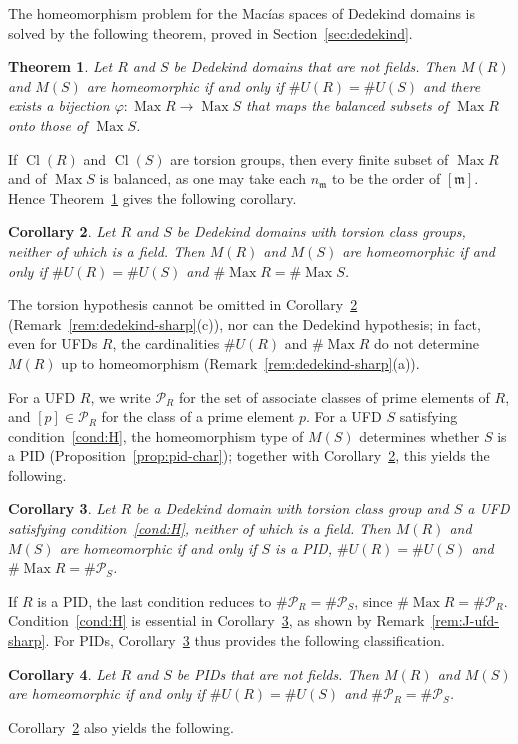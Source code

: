 \documentclass[12pt,reqno,a4paper]{amsart}
\newcommand{\Pe}{\mathcal{P}}
\newcommand{\m}{\mathfrak{m}}
\DeclareMathOperator{\Max}{Max}
\DeclareMathOperator{\Cl}{Cl}
\theoremstyle{plain}
\newtheorem{theorem}{Theorem}[section]
\newtheorem{corollary}[theorem]{Corollary}
\theoremstyle{definition}
\begin{document}
The homeomorphism problem for the Mac\'ias spaces of Dedekind domains is solved by the following theorem, proved in Section~\ref{sec:dedekind}.
\begin{theorem}\label{thm:C}
Let $R$ and $S$ be Dedekind domains that are not fields. Then $M(R)$ and $M(S)$ are homeomorphic if and only if $\#U(R)=\#U(S)$ and there exists a bijection $\varphi\colon\Max R\to\Max S$ that maps the balanced subsets of $\Max R$ onto those of $\Max S$.
\end{theorem}

If $\Cl(R)$ and $\Cl(S)$ are torsion groups, then every finite subset of $\Max R$ and of $\Max S$ is balanced, as one may take each $n_\m$ to be the order of $[\m]$. Hence Theorem~\ref{thm:C} gives the following corollary.
\begin{corollary}\label{cor:torsion}
Let $R$ and $S$ be Dedekind domains with torsion class groups, neither of which is a field. Then $M(R)$ and $M(S)$ are homeomorphic if and only if $\#U(R)=\#U(S)$ and $\#{\Max R}=\#{\Max S}$.
\end{corollary}

The torsion hypothesis cannot be omitted in Corollary~\ref{cor:torsion} (Remark~\ref{rem:dedekind-sharp}(c)), nor can the Dedekind hypothesis; in fact, even for UFDs $R$, the cardinalities $\#U(R)$ and $\#{\Max R}$ do not determine $M(R)$ up to homeomorphism (Remark~\ref{rem:dedekind-sharp}(a)).

For a UFD $R$, we write $\Pe_R$ for the set of associate classes of prime elements of $R$, and $[p]\in\Pe_R$ for the class of a prime element $p$. For a UFD $S$ satisfying condition~\ref{cond:H}, the homeomorphism type of $M(S)$ determines whether $S$ is a PID (Proposition~\ref{prop:pid-char}); together with Corollary~\ref{cor:torsion}, this yields the following.
\begin{corollary}\label{cor:pid-ufd}
Let $R$ be a Dedekind domain with torsion class group and $S$ a UFD satisfying condition~\ref{cond:H}, neither of which is a field. Then $M(R)$ and $M(S)$ are homeomorphic if and only if $S$ is a PID, $\#U(R)=\#U(S)$ and $\#{\Max R}=\#\Pe_S$.
\end{corollary}

If $R$ is a PID, the last condition reduces to $\#\Pe_R=\#\Pe_S$, since
$\#{\Max R}=\#\Pe_R$. Condition~\ref{cond:H} is essential in
Corollary~\ref{cor:pid-ufd}, as shown by Remark~\ref{rem:J-ufd-sharp}.
For PIDs, Corollary~\ref{cor:pid-ufd} thus provides the following
classification.
\begin{corollary}\label{cor:pid-main}
Let $R$ and $S$ be PIDs that are not fields. Then $M(R)$ and $M(S)$ are homeomorphic if and only if $\#U(R)=\#U(S)$ and $\#\Pe_R=\#\Pe_S$.
\end{corollary}
Corollary~\ref{cor:torsion} also yields the following.
\end{document}
